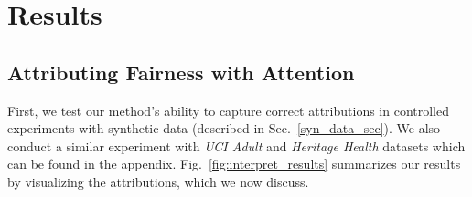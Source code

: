 \section{Results}
\subsection{Attributing Fairness with Attention} 
\label{sec:interpret_fairness}

First, we test our method's ability to capture correct attributions in controlled experiments with synthetic data (described in Sec.~\ref{syn_data_sec}). We also conduct a similar experiment with \textit{UCI Adult} and \textit{Heritage Health} datasets which can be found in the appendix. Fig.~\ref{fig:interpret_results} summarizes our results by visualizing the attributions, which we now discuss. 

